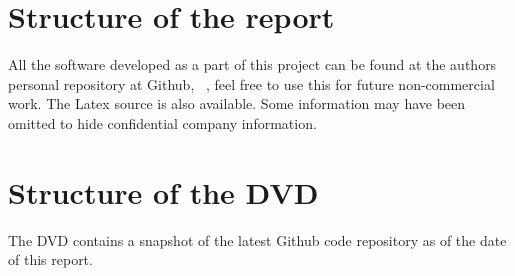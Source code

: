 \section{Structure of the report}
All the software developed as a part of this project can be found at the authors personal repository at Github, ~\cite{github}, feel free to use this for future non-commercial work. The Latex source is also available. Some information may have been omitted to hide confidential company information.

\section{Structure of the DVD}
The DVD contains a snapshot of the latest Github code repository as of the date of this report.